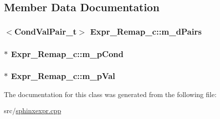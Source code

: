 \subsection{Member Data Documentation}
\hypertarget{classExpr__Remap__c_ae06589f380477db2bb1ce61514bf36fd}{
\subsubsection[{m\-\_\-d\-Pairs}]{$<${\bf Cond\-Val\-Pair\-\_\-t}$>$ Expr\-\_\-\-Remap\-\_\-c\-::m\-\_\-d\-Pairs\hspace{0.3cm}{\ttfamily [private]}}}\label{classExpr__Remap__c_ae06589f380477db2bb1ce61514bf36fd}
\hypertarget{classExpr__Remap__c_ad08931788e070932ce7600eed91706e6}{
\subsubsection[{m\-\_\-p\-Cond}]{$\ast$ Expr\-\_\-\-Remap\-\_\-c\-::m\-\_\-p\-Cond\hspace{0.3cm}{\ttfamily [private]}}}\label{classExpr__Remap__c_ad08931788e070932ce7600eed91706e6}
\hypertarget{classExpr__Remap__c_acde4455202ad7f76ddda559a96ec2ca5}{
\subsubsection[{m\-\_\-p\-Val}]{$\ast$ Expr\-\_\-\-Remap\-\_\-c\-::m\-\_\-p\-Val\hspace{0.3cm}{\ttfamily [private]}}}\label{classExpr__Remap__c_acde4455202ad7f76ddda559a96ec2ca5}


The documentation for this class was generated from the following file\-:\begin{DoxyCompactItemize}
\item 
src/\hyperlink{sphinxexpr_8cpp}{sphinxexpr.\-cpp}\end{DoxyCompactItemize}
